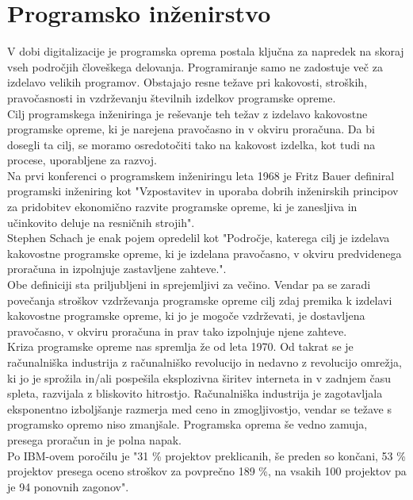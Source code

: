 \documentclass[a4paper,12pt,openright]{book}
\begin{document}
\section{Programsko inženirstvo}
V dobi digitalizacije je programska oprema postala ključna za napredek na skoraj vseh področjih človeškega delovanja. Programiranje samo ne zadostuje več za izdelavo velikih programov. Obstajajo resne težave pri kakovosti, stroških, pravočasnosti in vzdrževanju številnih izdelkov programske opreme.\\
Cilj programskega inženiringa je reševanje teh težav z izdelavo kakovostne programske opreme, ki je narejena pravočasno in v okviru proračuna. Da bi dosegli ta cilj, se moramo osredotočiti tako na kakovost izdelka, kot tudi na procese, uporabljene za razvoj.\cite{aggarwal2005software} \\
Na prvi konferenci o programskem inženiringu leta 1968 je Fritz Bauer definiral programski inženiring kot "Vzpostavitev in uporaba dobrih inženirskih principov za pridobitev ekonomično razvite programske opreme, ki je zanesljiva in učinkovito deluje na resničnih strojih". \\
Stephen Schach je enak pojem opredelil kot "Področje, katerega cilj je izdelava kakovostne programske opreme, ki je izdelana pravočasno, v okviru predvidenega proračuna in izpolnjuje zastavljene zahteve.".\cite{randell19961968} \\ Obe definiciji sta priljubljeni in sprejemljivi za večino. Vendar pa se zaradi povečanja stroškov vzdrževanja programske opreme cilj zdaj premika k izdelavi kakovostne programske opreme, ki jo je mogoče vzdrževati, je dostavljena pravočasno, v okviru proračuna in prav tako izpolnjuje njene zahteve. \\
Kriza programske opreme nas spremlja že od leta 1970. Od takrat se je računalniška industrija z računalniško revolucijo in nedavno z revolucijo omrežja, ki jo je sprožila in/ali pospešila eksplozivna širitev interneta in v zadnjem času spleta, razvijala z bliskovito hitrostjo.
Računalniška industrija je zagotavljala eksponentno izboljšanje razmerja med ceno in zmogljivostjo, vendar se težave s programsko opremo niso zmanjšale. Programska oprema še vedno zamuja, presega proračun in je polna napak. \cite{aggarwal2005software} \\
Po IBM-ovem poročilu je "31 \% projektov preklicanih, še preden so končani, 53 \% projektov presega oceno stroškov za povprečno 189 \%, na vsakih 100 projektov pa je 94 ponovnih zagonov". \cite{boehm2006view}
\end{document}
